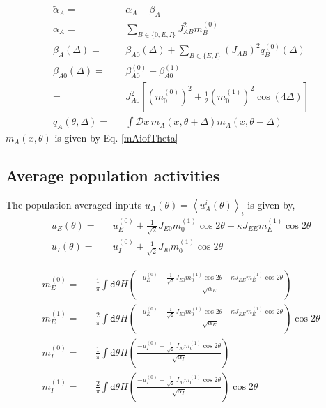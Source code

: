 \begin{eqnarray}
\tilde{\alpha}_A =&& \alpha_A - \beta_A \\ %
\alpha_{A} =&& \sum_{B \in \lbrace 0, E, I \rbrace} J_{AB}^2 m_B^{(0)} \\
\beta_{A}(\Delta) =&&  \beta_{A0} (\Delta) + \sum_{B \in \lbrace E, I \rbrace}  \left(J_{AB}\right)^2 q_B^{(0)}(\Delta) \\
\beta_{A0} (\Delta) =&& \beta_{A0}^{(0)} + \beta_{A0}^{(1)} \nonumber \\
=&& J^2_{A0} \left[ (m_0^{(0)})^2 + \frac{1}{2}(m_0^{(1)})^2  \cos(4\Delta) \right] \\
q_A (\theta, \Delta) =&& \int \mathcal{D} x \,  m_A(x, \theta + \Delta)  m_A(x, \theta - \Delta) 
\end{eqnarray}
$m_A(x, \theta)$ is given by Eq. \ref{mAiofTheta}

\subsection{Average population activities}

The population averaged inputs $u_A(\theta) = \left\langle u_A^i(\theta) \right\rangle_{i}$ is given by, 
\begin{eqnarray}
u_E(\theta) =&& u^{(0)}_E + \frac{1}{\sqrt{2}} J_{E0} m_0^{(1)} \cos 2 \theta + \kappa J_{EE} m_E^{(1)} \cos 2 \theta \\
u_I(\theta) =&& u^{(0)}_I + \frac{1}{\sqrt{2}} J_{I0} m_0^{(1)} \cos 2 \theta 
\end{eqnarray}

\begin{widetext}
\begin{eqnarray}
m_E^{(0)} =&& \frac{1}{\pi} \int \mathtt{d} \theta H \left( \frac{-u^{(0)}_E - \frac{1}{\sqrt{2}} J_{E0} m_0^{(1)} \cos 2 \theta - \kappa  J_{EE} m_E^{(1)} \cos 2 \theta}{\sqrt{\alpha_E} } \right)  \label{me0} \\
m_E^{(1)} =&& \frac{2}{\pi} \int \mathtt{d} \theta H \left( \frac{-u^{(0)}_E - \frac{1}{\sqrt{2}} J_{E0} m_0^{(1)} \cos 2 \theta - \kappa  J_{EE} m_E^{(1)} \cos 2 \theta}{\sqrt{\alpha_E} } \right) \cos 2 \theta  \label{me1} \\
m_I^{(0)} =&& \frac{1}{\pi} \int \mathtt{d} \theta H \left( \frac{-u^{(0)}_I - \frac{1}{\sqrt{2}} J_{I0} m_0^{(1)} \cos 2 \theta}{\sqrt{\alpha_I} } \right)  \label{mi0} \\
m_I^{(1)} =&& \frac{2}{\pi} \int \mathtt{d} \theta H \left( \frac{-u^{(0)}_I - \frac{1}{\sqrt{2}} J_{I0} m_0^{(1)} \cos 2 \theta }{\sqrt{\alpha_I} } \right) \cos 2 \theta  \label{mi1}
\end{eqnarray}
\end{widetext}

